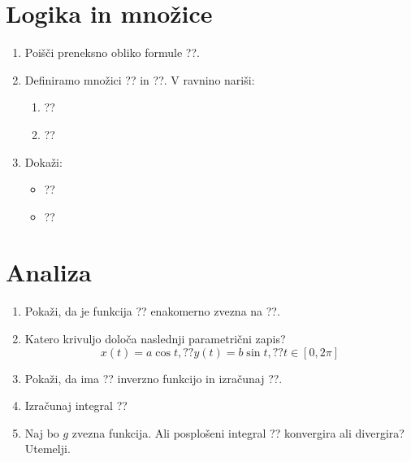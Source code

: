 \documentclass[a4paper,12pt]{article}
\begin{document}

\section*{Logika in množice}

\begin{enumerate}
\item
Poišči preneksno obliko formule ??.

\item
Definiramo množici ?? in ??.
V ravnino nariši:
\begin{enumerate}
\item ??
\item ??
\end{enumerate}

\item
Dokaži:
\begin{itemize}
\item ??
\item ??
\end{itemize}
\end{enumerate}

\section*{Analiza}

\begin{enumerate}
\item
Pokaži, da je funkcija ?? enakomerno zvezna na ??.

\item
Katero krivuljo določa naslednji parametrični zapis?
\[
x(t) = a \cos t, ?? %
y(t) = b \sin t, ?? %
t \in [0, 2 \pi]
\]

\item
Pokaži, da ima ?? inverzno funkcijo in izračunaj ??.

\item
Izračunaj integral
??

\item
Naj bo \(g\) zvezna funkcija. Ali posplošeni integral
??
konvergira ali divergira? Utemelji.
\end{enumerate}
\end{document}
